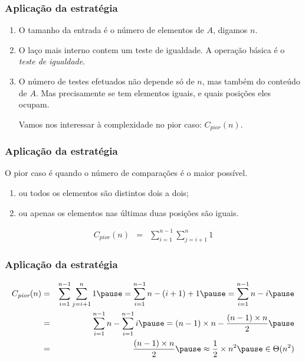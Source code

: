 \documentclass[handout]{beamer}
\begin{document}
\begin{frame}
\frametitle{Aplicação da estratégia}

\begin{small}

\end{small}

\begin{enumerate}
\item O tamanho da entrada é o número de elementos de $A$, digamos $n$.
\item O laço mais interno contem um teste de igualdade. A operação básica é o \emph{teste de igualdade}.
\item O número de testes efetuados não depende só de $n$, mas também do
  conteúdo de $A$. Mas precisamente se tem elementos iguais, e quais
  posições eles ocupam.

  Vamos nos interessar à complexidade \alert{no pior caso}: $C_{\textit{pior}}(n)$.
\end{enumerate}
\end{frame}

\begin{frame}
\frametitle{Aplicação da estratégia}

\begin{small}

\end{small}

O pior caso é quando o número de comparações é o maior possível.
\begin{enumerate}
\item ou todos os elementos são distintos dois a dois;
\item ou apenas os elementos nas últimas duas posições são iguais.
\end{enumerate}
\begin{eqnarray*}
C_{\textit{pior}}(n) & = & \sum_{i = 1}^{n-1} \sum_{j = i+1}^{n} 1
\end{eqnarray*}
\end{frame}

\begin{frame}
\frametitle{Aplicação da estratégia}

\begin{small}

\end{small}

\begin{eqnarray*}
C_{\textit{pior}}(n) & = & \sum_{i = 1}^{n-1} \sum_{j = i+1}^{n} 1 \pause = \sum_{i=1}^{n-1} n - (i+1) + 1 \pause = \sum_{i=1}^{n-1} n - i \pause \\
& = & \sum_{i=1}^{n-1} n - \sum_{i=1}^{n-1} i \pause = (n-1)\times n - \frac{(n-1)\times n}{2} \pause \\
& = & \frac{(n-1)\times n}{2} \pause \approx \frac{1}{2}\times n^2 \pause \in \Theta(n^2)
\end{eqnarray*}
\end{frame}
\end{document}
